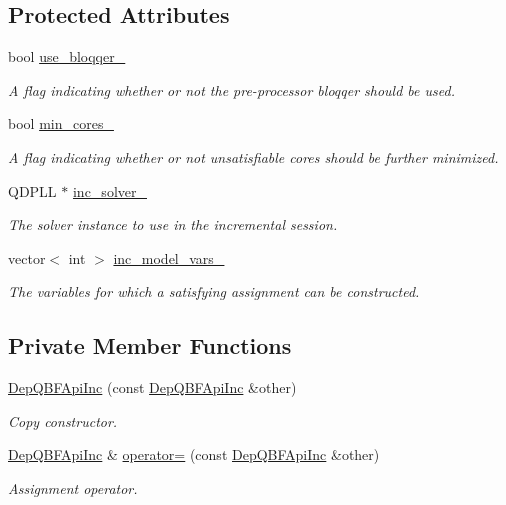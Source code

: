 \subsection*{Protected Attributes}
\begin{DoxyCompactItemize}
\item 
bool \hyperlink{classDepQBFApiInc_af02ebc9cd6d44dabef38211a0aa382e6}{use\-\_\-bloqqer\-\_\-}
\begin{DoxyCompactList}\small\item\em A flag indicating whether or not the pre-\/processor bloqqer should be used. \end{DoxyCompactList}\item 
bool \hyperlink{classDepQBFApiInc_a973cfad8d1464ceab22eab182332fe20}{min\-\_\-cores\-\_\-}
\begin{DoxyCompactList}\small\item\em A flag indicating whether or not unsatisfiable cores should be further minimized. \end{DoxyCompactList}\item 
Q\-D\-P\-L\-L $\ast$ \hyperlink{classDepQBFApiInc_ab1380371d12eb536493bfa8851ee7bc3}{inc\-\_\-solver\-\_\-}
\begin{DoxyCompactList}\small\item\em The solver instance to use in the incremental session. \end{DoxyCompactList}\item 
vector$<$ int $>$ \hyperlink{classDepQBFApiInc_a4dc19de8b66b9133906d7ef6b228e075}{inc\-\_\-model\-\_\-vars\-\_\-}
\begin{DoxyCompactList}\small\item\em The variables for which a satisfying assignment can be constructed. \end{DoxyCompactList}\end{DoxyCompactItemize}
\subsection*{Private Member Functions}
\begin{DoxyCompactItemize}
\item 
\hyperlink{classDepQBFApiInc_a1f6265470a8d137973acf9a3a8a41d64}{Dep\-Q\-B\-F\-Api\-Inc} (const \hyperlink{classDepQBFApiInc}{Dep\-Q\-B\-F\-Api\-Inc} \&other)
\begin{DoxyCompactList}\small\item\em Copy constructor. \end{DoxyCompactList}\item 
\hyperlink{classDepQBFApiInc}{Dep\-Q\-B\-F\-Api\-Inc} \& \hyperlink{classDepQBFApiInc_a29aebedc976f97274b83325e4ca73b96}{operator=} (const \hyperlink{classDepQBFApiInc}{Dep\-Q\-B\-F\-Api\-Inc} \&other)
\begin{DoxyCompactList}\small\item\em Assignment operator. \end{DoxyCompactList}\end{DoxyCompactItemize}


